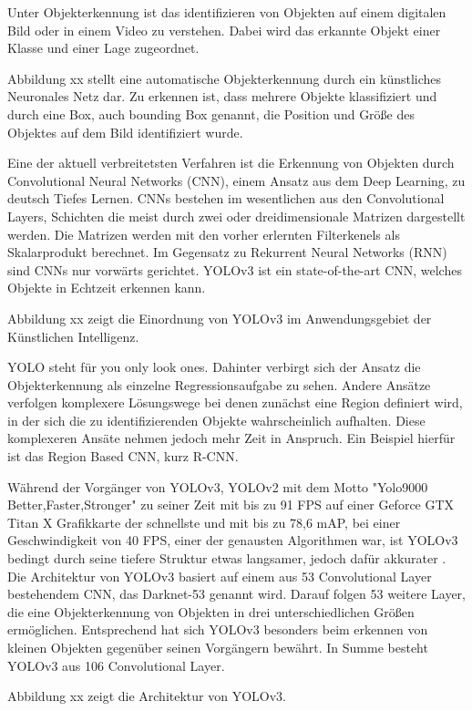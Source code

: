 Unter Objekterkennung ist das identifizieren von Objekten auf einem digitalen Bild oder in einem Video zu verstehen. Dabei wird das erkannte Objekt einer Klasse und einer Lage zugeordnet. 

Abbildung xx stellt eine automatische Objekterkennung durch ein künstliches Neuronales Netz dar. Zu erkennen ist, dass mehrere Objekte klassifiziert und durch eine Box, auch bounding Box genannt, die Position und Größe des Objektes auf dem Bild identifiziert wurde. 

Eine der aktuell verbreitetsten Verfahren ist die Erkennung von Objekten durch Convolutional Neural Networks (CNN), einem Ansatz aus dem Deep Learning, zu deutsch Tiefes Lernen. CNNs bestehen im wesentlichen aus den Convolutional Layers, Schichten die meist durch zwei oder dreidimensionale Matrizen dargestellt werden. Die Matrizen werden mit den vorher erlernten Filterkenels als Skalarprodukt berechnet. Im Gegensatz zu Rekurrent Neural Networks (RNN) sind CNNs nur vorwärts gerichtet. YOLOv3 ist ein state-of-the-art CNN, welches Objekte in Echtzeit erkennen kann.  




Abbildung xx zeigt die Einordnung von YOLOv3 im Anwendungsgebiet der Künstlichen Intelligenz. 


YOLO steht für you only look ones. Dahinter verbirgt sich der Ansatz die Objekterkennung als einzelne Regressionsaufgabe zu sehen. Andere Ansätze verfolgen komplexere Lösungswege bei denen zunächst eine Region definiert wird, in der sich die zu identifizierenden Objekte wahrscheinlich aufhalten. Diese komplexeren Ansäte nehmen jedoch mehr Zeit in Anspruch. Ein Beispiel hierfür ist das Region Based CNN, kurz R-CNN. 

Während der Vorgänger von YOLOv3, YOLOv2 mit dem Motto "Yolo9000 Better,Faster,Stronger" zu seiner Zeit mit bis zu 91 FPS auf einer Geforce GTX Titan X Grafikkarte der schnellste und mit bis zu 78,6 mAP, bei einer Geschwindigkeit von 40 FPS, einer der genausten Algorithmen war, ist YOLOv3 bedingt durch seine tiefere Struktur etwas langsamer, jedoch dafür akkurater \cite{redmon2017yolo9000}. Die Architektur von YOLOv3 basiert auf einem aus 53 Convolutional Layer bestehendem CNN, das Darknet-53 genannt wird. 
Darauf folgen 53 weitere Layer, die eine Objekterkennung von Objekten in drei unterschiedlichen Größen ermöglichen. Entsprechend hat sich YOLOv3 besonders beim erkennen von kleinen Objekten gegenüber seinen Vorgängern bewährt. In Summe besteht YOLOv3 aus 106 Convolutional Layer.


Abbildung xx zeigt die Architektur von YOLOv3.








